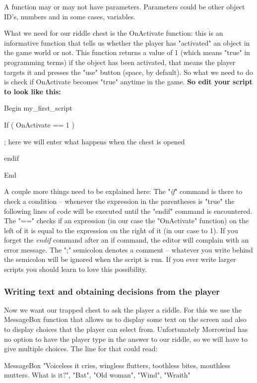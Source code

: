 \documentclass[
]{article}
\begin{document}
A function may or may not have parameters. Parameters could be other
object ID's, numbers and in some cases, variables.

What we need for our riddle chest is the OnActivate function: this is an
informative function that tells us whether the player has "activated" an
object in the game world or not. This function returns a value of 1
(which means "true" in programming terms) if the object has been
activated, that means the player targets it and presses the "use" button
(space, by default). So what we need to do is check if OnActivate
becomes "true" anytime in the game. \textbf{So edit your script to look
like this:}

Begin my\_first\_script

If ( OnActivate == 1 )

; here we will enter what happens when the chest is opened

endif

End

A couple more things need to be explained here: The "\emph{if}" command
is there to check a condition -- whenever the expression in the
parentheses is "true" the following lines of code will be executed until
the "endif" command is encountered. The "==" checks if an expression (in
our case the "OnActivate" function) on the left of it is equal to the
expression on the right of it (in our case to 1). If you forget the
\emph{endif} command after an if command, the editor will complain with
an error message. The ";" semicolon denotes a comment -- whatever you
write behind the semicolon will be ignored when the script is run. If
you ever write larger scripts you should learn to love this possibility.

\hypertarget{writing-text-and-obtaining-decisions-from-the-player}{%
\subsubsection{Writing text and obtaining decisions from the
player}\label{writing-text-and-obtaining-decisions-from-the-player}}

Now we want our trapped chest to ask the player a riddle. For this we
use the MessageBox function that allows us to display some text on the
screen and also to display choices that the player can select from.
Unfortunately Morrowind has no option to have the player type in the
answer to our riddle, so we will have to give multiple choices. The line
for that could read:

MessageBox "Voiceless it cries, wingless flutters, toothless bites,
mouthless mutters. What is it?", "Bat", "Old woman", "Wind", "Wraith"
\end{document}
